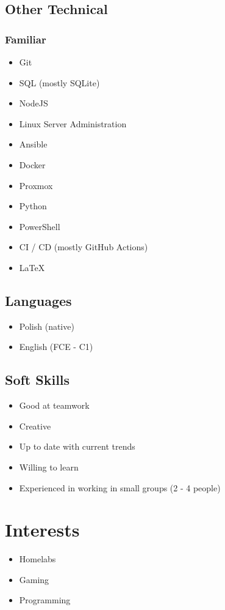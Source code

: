 \documentclass{cv}
\begin{document}
\begin{minipage}[t]{.3\textwidth}
    \subsection{Other Technical}

    \subsubsection{Familiar}

    \begin{itemize}
        \item Git
        \item SQL (mostly SQLite)
        \item NodeJS
        \item Linux Server Administration
        \item Ansible
        \item Docker
        \item Proxmox
        \item Python
        \item PowerShell
        \item CI / CD (mostly GitHub Actions)
        \item \LaTeX
    \end{itemize}

    \subsection{Languages}

    \begin{itemize}
        \item Polish (native)
        \item English (FCE - C1)
    \end{itemize}

    \subsection{Soft Skills}

    \begin{itemize}
        \item Good at teamwork
        \item Creative
        \item Up to date with current trends
        \item Willing to learn
        \item Experienced in working in small groups (2 - 4 people)
    \end{itemize}

    \section{Interests}

    \begin{itemize}
        \item Homelabs
        \item Gaming
        \item Programming
    \end{itemize}

\end{minipage}

\rodo
\end{document}
